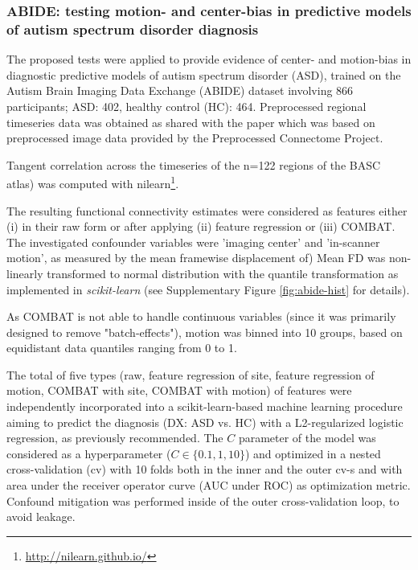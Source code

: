 \documentclass{article}
\begin{document}
\subsubsection*{ABIDE: testing motion- and center-bias in predictive models of autism spectrum disorder diagnosis}

The proposed tests were applied to provide evidence of center- and  motion-bias in diagnostic predictive models of autism spectrum disorder (ASD), trained on the Autism Brain Imaging Data Exchange (ABIDE) dataset\citep{di2014autism} involving 866 participants; ASD: 402, healthy control (HC): 464. Preprocessed regional timeseries data was obtained as shared with the paper\citep{dadi2019benchmarking} which was based on preprocessed image data provided by the Preprocessed Connectome Project\citep{craddock2013neuro}.

Tangent correlation across the timeseries of the n=122 regions of the BASC\citep{bellec2010multi} atlas) was computed with nilearn\footnote{\href{http://nilearn.github.io/}{http://nilearn.github.io/}}\citep{huntenburg2017loading, esteve2015big}. 

The resulting functional connectivity estimates were considered as features either (i) in their raw form or after applying (ii) feature regression\citep{rao2017predictive} or (iii) COMBAT\citep{johnson2007adjusting, fortin2018harmonization}.
The investigated confounder variables were 'imaging center' and 'in-scanner motion', as measured by the mean framewise displacement of\cite{power2014methods})
Mean FD was non-linearly transformed to normal distribution with the quantile transformation\citep{beasley2009rank} as implemented in \emph{scikit-learn}\citep{pedregosa2011scikit} (see Supplementary Figure \ref{fig:abide-hist} for details).

As COMBAT is not able to handle continuous variables (since it was primarily designed to remove "batch-effects"), motion was binned into 10 groups, based on equidistant data quantiles ranging from 0 to 1.

The total of five types (raw, feature regression of site, feature regression of motion, COMBAT with site, COMBAT with motion) of features were independently incorporated into a scikit-learn-based\citep{pedregosa2011scikit} machine learning procedure aiming to predict the diagnosis (DX: ASD vs. HC) with a L2-regularized logistic regression, as previously recommended\citep{dadi2019benchmarking}. The $C$ parameter of the model was considered as a hyperparameter ($C \in \{0.1, 1, 10\}$) and optimized in a nested cross-validation (cv) with 10 folds both in the inner and the outer cv-s and with area under the receiver operator curve (AUC under ROC) as optimization metric. Confound mitigation was performed inside of the outer cross-validation loop, to avoid leakage.
\end{document}
